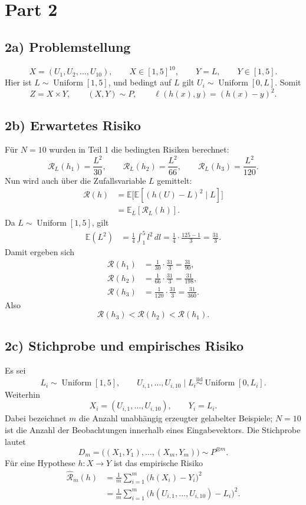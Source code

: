 \documentclass[11pt,a4paper]{article}
\newcommand{\E}{\mathbb{E}}
\newcommand{\Unif}{\operatorname{Uniform}}
\newcommand{\Risk}{\mathcal{R}}
\begin{document}
\section*{Part 2}
\subsection*{2a) Problemstellung}
\[
 X=(U_1,U_2,\ldots,U_{10}),\qquad
 X\in[1,5]^{10},\qquad
 Y=L,\qquad Y\in[1,5].
\]
Hier ist $L\sim\Unif[1,5]$, und bedingt auf $L$ gilt
$U_i\sim\Unif[0,L]$. Somit
\[
 Z=X\times Y,\qquad (X,Y)\sim P,
 \qquad \ell(h(x),y)=(h(x)-y)^2.
\]

\subsection*{2b) Erwartetes Risiko}
Für $N=10$ wurden in Teil 1 die bedingten Risiken berechnet:
\[
 \Risk_L(h_1)=\frac{L^2}{30},\qquad
 \Risk_L(h_2)=\frac{L^2}{66},\qquad
 \Risk_L(h_3)=\frac{L^2}{120}.
\]
Nun wird auch über die Zufallsvariable $L$ gemittelt:
\begin{align*}
 \Risk(h)
 &=\E\bigl[\E[(h(U)-L)^2\mid L]\bigr]\\
 &=\E_L[\Risk_L(h)].
\end{align*}
Da $L\sim\Unif[1,5]$, gilt
\begin{align*}
 \E(L^2)
 &=\frac14\int_1^5 l^2\,dl
 =\frac14\cdot\frac{125-1}{3}
 =\frac{31}{3}.
\end{align*}
Damit ergeben sich
\begin{align*}
 \Risk(h_1)&=\frac1{30}\cdot\frac{31}{3}=\frac{31}{90},\\
 \Risk(h_2)&=\frac1{66}\cdot\frac{31}{3}=\frac{31}{198},\\
 \Risk(h_3)&=\frac1{120}\cdot\frac{31}{3}=\frac{31}{360}.
\end{align*}
Also
\[
 \boxed{\Risk(h_3)<\Risk(h_2)<\Risk(h_1)}.
\]

\subsection*{2c) Stichprobe und empirisches Risiko}
Es sei
\[
 L_i\sim\Unif[1,5],\qquad
 U_{i,1},\ldots,U_{i,10}\mid L_i
 \overset{\mathrm{iid}}{\sim}\Unif[0,L_i].
\]
Weiterhin
\[
 X_i=(U_{i,1},\ldots,U_{i,10}),\qquad Y_i=L_i.
\]
Dabei bezeichnet $m$ die Anzahl unabhängig erzeugter gelabelter Beispiele;
$N=10$ ist die Anzahl der Beobachtungen innerhalb eines Eingabevektors.
Die Stichprobe lautet
\[
 D_m=\bigl((X_1,Y_1),\ldots,(X_m,Y_m)\bigr)\sim P^{\otimes m}.
\]
Für eine Hypothese $h\colon X\to Y$ ist das empirische Risiko
\begin{align*}
 \widehat{\Risk}_m(h)
 &=\frac1m\sum_{i=1}^m\bigl(h(X_i)-Y_i\bigr)^2\\
 &=\frac1m\sum_{i=1}^m
 \bigl(h(U_{i,1},\ldots,U_{i,10})-L_i\bigr)^2.
\end{align*}
\end{document}
